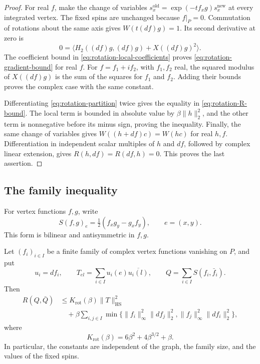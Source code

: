 \begin{proof}
For real \(f\), make the change of variables
\(s_x^{\mathrm{old}}=\exp(-tf_xg)s_x^{\mathrm{new}}\) at every
integrated vertex. The fixed spins are unchanged because \(f|_P=0\).
Commutation of rotations about the same axis gives
\(W(t(df)g)=1\). Its second derivative at zero is
\[
0=\bigl\langle H_2((df)g,(df)g)+X((df)g)^2\bigr\rangle.
\]
The coefficient bound in \eqref{eq:rotation-local-coefficients} proves
\eqref{eq:rotation-gradient-bound} for real \(f\). For
\(f=f_1+if_2\), with \(f_1,f_2\) real, the squared modulus of
\(X((df)g)\) is the sum of the squares for \(f_1\) and \(f_2\).
Adding their bounds proves the complex case with the same constant.

Differentiating \eqref{eq:rotation-partition} twice gives the equality
in \eqref{eq:rotation-R-bound}. The local term is bounded in absolute
value by \(\beta\|h\|_2^2\), and the other term is nonnegative
before its minus sign, proving the inequality. Finally, the same change
of variables gives
\(W((h+df)c)=W(hc)\) for real \(h,f\). Differentiation in independent
scalar multiples of \(h\) and \(df\), followed by complex linear
extension, gives \(R(h,df)=R(df,h)=0\). This proves the last assertion.
\end{proof}

\subsection{The family inequality}

For vertex functions \(f,g\), write
\begin{equation}
\label{eq:rotation-S-definition}
S(f,g)_e=\tfrac12(f_xg_y-g_xf_y),\qquad e=(x,y).
\end{equation}
This form is bilinear and antisymmetric in \(f,g\).

\begin{proposition}\label{prop:fourth}
Let \((f_i)_{i\in I}\) be a finite family of complex vertex functions
vanishing on \(P\), and put
\[
u_i=df_i,\qquad
T_{el}=\sum_{i\in I}u_i(e)\overline{u_i(l)},\qquad
Q=\sum_{i\in I}S(f_i,\bar f_i).
\]
Then
\begin{equation}
\label{eq:rotation-family-bound}
\begin{split}
R(Q,\bar Q)
&\le K_{\mathrm{rot}}(\beta)\|T\|_{\mathrm{HS}}^2\\
&\quad+\beta\sum_{i,j\in I}
\min\bigl\{\|f_i\|_\infty^2\|df_j\|_2^2,
             \|f_j\|_\infty^2\|df_i\|_2^2\bigr\},
\end{split}
\end{equation}
where
\begin{equation}
\label{eq:rotation-explicit-constant}
K_{\mathrm{rot}}(\beta)=6\beta^2+4\beta^{3/2}+\beta.
\end{equation}
In particular, the constants are independent of the graph, the family
size, and the values of the fixed spins.
\end{proposition}

